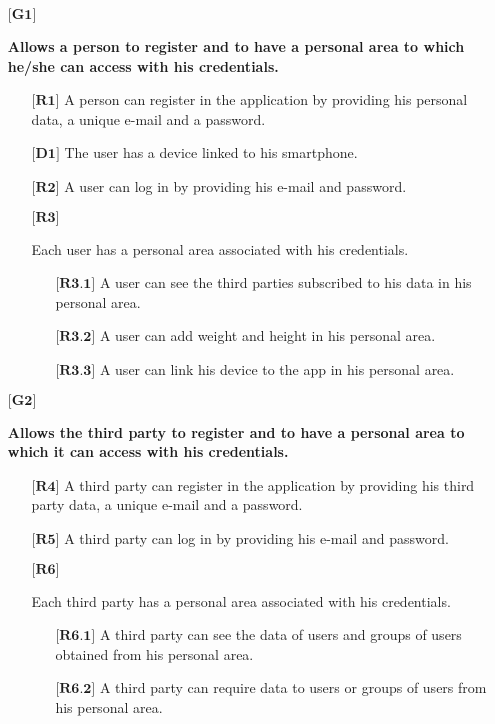\vspace{0.3cm}

\begin{itemize}

	\item[${\textbf{[G1]}}$] {\textbf{Allows a person to register and to have a personal area to which he/she can access with his credentials.}
		\begin{itemize}
			\item[$\textbf{[R1]}$] {A person can register in the application by providing his personal data, a unique e-mail and a password.}
			\item[$\textbf{[D1]}$] {The user has a device linked to his smartphone.}
			\item[$\textbf{[R2]}$] {A user can log in by providing his e-mail and password.}
			\item[$\textbf{[R3]}$] {Each user has a personal area associated with his credentials.
				\begin{itemize}
					\item[$\textbf{[R3.1]}$] {A user can see the third parties subscribed to his data in his personal area.}
					\item[$\textbf{[R3.2]}$] {A user can add weight and height in his personal area.}
					\item[$\textbf{[R3.3]}$] {A user can link his device to the app in his personal area.}
				\end{itemize}}
		\end{itemize}}


	\item[${\textbf{[G2]}}$] {\textbf{Allows the third party to register and to have a personal area to which it can access with his credentials.}
		\begin{itemize}
			\item[$\textbf{[R4]}$] {A third party can register in the application by providing his third party data, a unique e-mail and a password.}
			\item[$\textbf{[R5]}$] {A third party can log in by providing his e-mail and password.}
			\item[$\textbf{[R6]}$] {Each third party has a personal area associated with his credentials.
				\begin{itemize}
					\item[$\textbf{[R6.1]}$] {A third party can see the data of users and groups of users obtained from his personal area.}
					\item[$\textbf{[R6.2]}$] {A third party can require data to users or groups of users from his personal area.}
				\end {itemize}}
		\end{itemize}}



\end{itemize}
